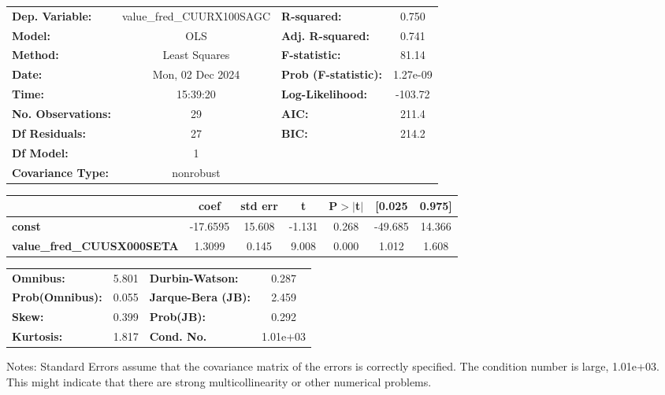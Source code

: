 \begin{center}
\begin{tabular}{lclc}
\toprule
\textbf{Dep. Variable:}            & value\_fred\_CUURX100SAGC & \textbf{  R-squared:         } &     0.750   \\
\textbf{Model:}                    &            OLS            & \textbf{  Adj. R-squared:    } &     0.741   \\
\textbf{Method:}                   &       Least Squares       & \textbf{  F-statistic:       } &     81.14   \\
\textbf{Date:}                     &      Mon, 02 Dec 2024     & \textbf{  Prob (F-statistic):} &  1.27e-09   \\
\textbf{Time:}                     &          15:39:20         & \textbf{  Log-Likelihood:    } &   -103.72   \\
\textbf{No. Observations:}         &               29          & \textbf{  AIC:               } &     211.4   \\
\textbf{Df Residuals:}             &               27          & \textbf{  BIC:               } &     214.2   \\
\textbf{Df Model:}                 &                1          & \textbf{                     } &             \\
\textbf{Covariance Type:}          &         nonrobust         & \textbf{                     } &             \\
\bottomrule
\end{tabular}
\begin{tabular}{lcccccc}
                                   & \textbf{coef} & \textbf{std err} & \textbf{t} & \textbf{P$> |$t$|$} & \textbf{[0.025} & \textbf{0.975]}  \\
\midrule
\textbf{const}                     &     -17.6595  &       15.608     &    -1.131  &         0.268        &      -49.685    &       14.366     \\
\textbf{value\_fred\_CUUSX000SETA} &       1.3099  &        0.145     &     9.008  &         0.000        &        1.012    &        1.608     \\
\bottomrule
\end{tabular}
\begin{tabular}{lclc}
\textbf{Omnibus:}       &  5.801 & \textbf{  Durbin-Watson:     } &    0.287  \\
\textbf{Prob(Omnibus):} &  0.055 & \textbf{  Jarque-Bera (JB):  } &    2.459  \\
\textbf{Skew:}          &  0.399 & \textbf{  Prob(JB):          } &    0.292  \\
\textbf{Kurtosis:}      &  1.817 & \textbf{  Cond. No.          } & 1.01e+03  \\
\bottomrule
\end{tabular}
\end{center}

Notes: \newline
 [1] Standard Errors assume that the covariance matrix of the errors is correctly specified. \newline
 [2] The condition number is large, 1.01e+03. This might indicate that there are \newline
 strong multicollinearity or other numerical problems.
